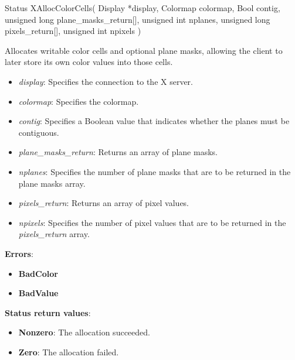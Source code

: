 \documentclass{report}
\begin{document}
\begin{itemize}
            \begin{cppcode}
                Status XAllocColorCells(
                    Display *display,
                    Colormap colormap,
                    Bool contig,
                    unsigned long plane_masks_return[],
                    unsigned int nplanes,
                    unsigned long pixels_return[],
                    unsigned int npixels
                )
            \end{cppcode}
            \bigbreak \noindent
            Allocates writable color cells and optional plane masks, allowing the client to later store its own color values into those cells.
            \begin{itemize}
                \item \textit{display}: Specifies the connection to the X server.
                \item \textit{colormap}: Specifies the colormap.
                \item \textit{contig}: Specifies a Boolean value that indicates whether the planes must be contiguous.
                \item \textit{plane\_masks\_return}: Returns an array of plane masks.
                \item \textit{nplanes}: Specifies the number of plane masks that are to be returned in the plane masks array.
                \item \textit{pixels\_return}: Returns an array of pixel values.
                \item \textit{npixels}: Specifies the number of pixel values that are to be returned in the \textit{pixels\_return} array.
            \end{itemize}
            \bigbreak \noindent
            \textbf{Errors}:
            \begin{itemize}
                \item \textbf{BadColor}
                \item \textbf{BadValue}
            \end{itemize}
            \bigbreak \noindent
            \textbf{Status return values}:
            \begin{itemize}
                \item \textbf{Nonzero}: The allocation succeeded.
                \item \textbf{Zero}: The allocation failed.
            \end{itemize}


\end{itemize}
\end{document}
